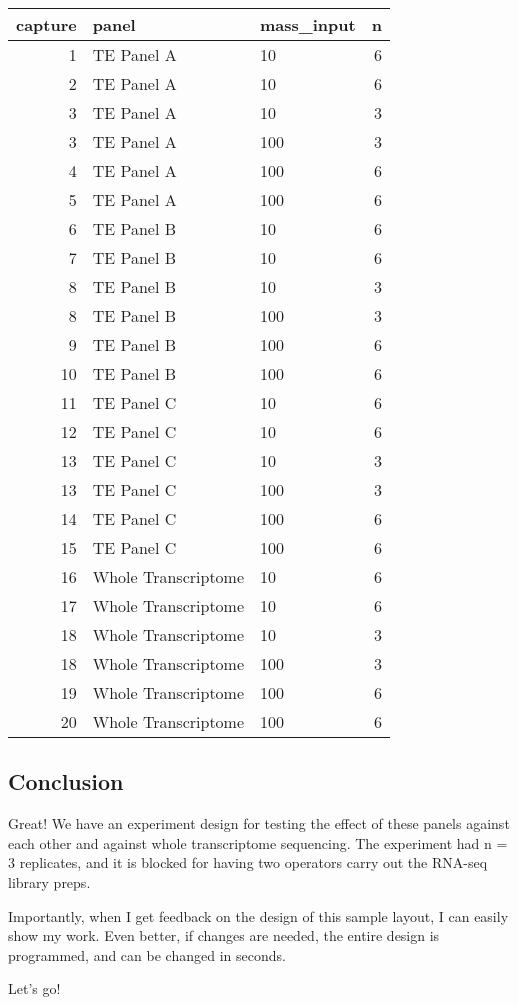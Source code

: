 \documentclass[
]{article}
\begin{document}
\begin{longtable}[]{@{}rllr@{}}
\toprule()
capture & panel & mass\_input & n \\
\midrule()
\endhead
1 & TE Panel A & 10 & 6 \\
2 & TE Panel A & 10 & 6 \\
3 & TE Panel A & 10 & 3 \\
3 & TE Panel A & 100 & 3 \\
4 & TE Panel A & 100 & 6 \\
5 & TE Panel A & 100 & 6 \\
6 & TE Panel B & 10 & 6 \\
7 & TE Panel B & 10 & 6 \\
8 & TE Panel B & 10 & 3 \\
8 & TE Panel B & 100 & 3 \\
9 & TE Panel B & 100 & 6 \\
10 & TE Panel B & 100 & 6 \\
11 & TE Panel C & 10 & 6 \\
12 & TE Panel C & 10 & 6 \\
13 & TE Panel C & 10 & 3 \\
13 & TE Panel C & 100 & 3 \\
14 & TE Panel C & 100 & 6 \\
15 & TE Panel C & 100 & 6 \\
16 & Whole Transcriptome & 10 & 6 \\
17 & Whole Transcriptome & 10 & 6 \\
18 & Whole Transcriptome & 10 & 3 \\
18 & Whole Transcriptome & 100 & 3 \\
19 & Whole Transcriptome & 100 & 6 \\
20 & Whole Transcriptome & 100 & 6 \\
\bottomrule()
\end{longtable}

\hypertarget{conclusion}{%
\subsection{Conclusion}\label{conclusion}}

Great! We have an experiment design for testing the effect of these
panels against each other and against whole transcriptome sequencing.
The experiment had n = 3 replicates, and it is blocked for having two
operators carry out the RNA-seq library preps.

Importantly, when I get feedback on the design of this sample layout, I
can easily show my work. Even better, if changes are needed, the entire
design is programmed, and can be changed in seconds.

Let's go!
\end{document}
